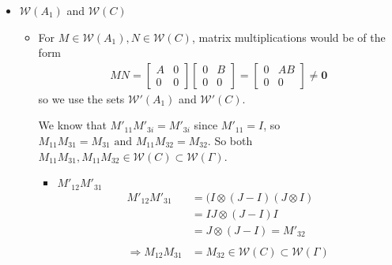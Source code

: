 \documentclass{article}
\begin{document}
\begin{itemize}
    \item $\mathcal{W}(A_1)$ and $\mathcal{W}(C)$ \\
    \begin{itemize}
        \item For $M\in\mathcal{W}(A_1),N \in \mathcal{W}(C)$, matrix multiplications would be of the form \\
        \begin{align*}
            MN = \begin{bmatrix}
                A & 0 \\ 0 & 0
            \end{bmatrix}\begin{bmatrix}
                0&B\\0&0
            \end{bmatrix} = \begin{bmatrix}
                0&AB\\0&0
            \end{bmatrix} \neq \mathbf{0}
        \end{align*}
        so we use the sets $\mathcal{W'}(A_1)$ and $\mathcal{W'}(C)$.
        
        We know that $M'_{11}M'_{3i} = M'_{3i}$ since $M'_{11} = I$, so $M_{11}M_{31} =M_{31}\text{ and } M_{11}M_{32} = M_{32}$. So both $M_{11}M_{31}, M_{11}M_{32}  \in \mathcal{W}(C) \subset\mathcal{W}(\Gamma)$.
        \begin{itemize}
            \item $M'_{12}M'_{31}$ \\
            \begin{align*}
                M'_{12}M'_{31}
                &= (I\otimes(J-I)(J\otimes I) \\
                &= IJ\otimes(J-I)I \\
                &= J\otimes (J-I) = M'_{32} \\ \\
                \Rightarrow M_{12}M_{31} &= M_{32} \in \mathcal{W}(C) \subset \mathcal{W}(\Gamma)
            \end{align*}
            

\end{itemize}
\end{itemize}
\end{itemize}
\end{document}
